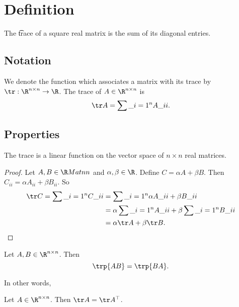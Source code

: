 
\section*{Definition}

The \t{trace} of a square real matrix is the sum of its diagonal entries.

\subsection*{Notation}

We denote the function which associates a matrix with its trace by $\tr: \R ^{n \times  n} \to \R $.
The trace of $A \in \R ^{n \times  n}$ is
  \[
\tr A = \sum\_{i = 1}^{n} A\_{ii}.
  \]

\subsection*{Properties}

\begin{proposition}The trace is a linear function on the vector space of $n \times  n$ real matrices.

\begin{proof}Let $A, B \in \R Mat{n}{n}$ and $\alpha , \beta  \in \R $.
Define $C = \alpha  A + \beta  B$.
Then $C_{ii} = \alpha  A_{ii} + \beta  B_{ii}$.
So
\[
\begin{aligned}
\tr C = \sum\_{i = 1}^{n} C\_{ii}
&= \sum\_{i = 1}^{n} \alpha  A\_{ii} + \beta  B\_{ii} \\
&= \alpha  \sum\_{i = 1}^{n} A\_{ii} + \beta  \sum\_{i = 1}^{n} B\_{ii} \\
&= \alpha  \tr A + \beta  \tr B.
\end{aligned}
\]\end{proof}\end{proposition}
\begin{proposition}Let $A, B \in \R ^{n \times  n}$. Then
\[
\trp{AB} = \trp{BA}.
\]\end{proposition}
In other words, 

\begin{proposition}Let $A \in \R ^{n \times  n}$. Then $\tr A = \tr A^\top $.\end{proposition}
\blankpage